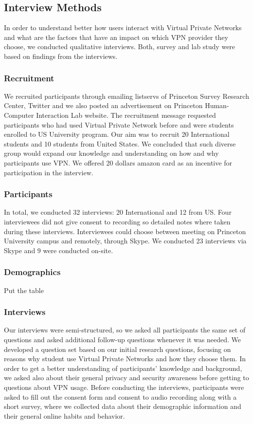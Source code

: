 \subsection{Interview Methods}\label{Method}
In order to understand better how users interact with Virtual Private Networks and what are the factors that have an impact on which VPN provider they choose, we conducted qualitative interviews. Both, survey and lab study were based on findings from the interviews.
\subsubsection{Recruitment}
We recruited participants through emailing listservs of Princeton Survey Research Center, Twitter and we also posted an advertisement on Princeton Human-Computer Interaction Lab website. The recruitment message requested participants who had used Virtual Private Network before and were students enrolled to US University program. Our aim was to recruit 20 International students and 10 students from United States. We concluded that such diverse group would expand our knowledge and understanding on how and why participants use VPN. We offered 20 dollars amazon card as an incentive for participation in the interview.
\subsubsection{Participants}
In total, we conducted 32 interviews: 20 International and 12 from US. Four interviewees did not give consent to recording so detailed notes where taken during these interviews. Interviewees could choose between meeting on Princeton University campus and remotely, through Skype. We conducted 23 interviews via Skype and 9 were conducted on-site. 

\subsubsection{Demographics} Put the table

\subsubsection{Interviews}
Our interviews were semi-structured, so we asked all participants the same set of questions and asked additional follow-up questions whenever it was needed. We developed a question set based on our initial research questions, focusing on reasons why student use Virtual Private Networks and how they choose them. In order to get a better understanding of participants' knowledge and background, we asked also about their general privacy and security awareness before getting to questions about VPN usage. 
Before conducting the interviews, participants were asked to fill out the consent form and consent to audio recording along with a short survey, where we collected data about their demographic information and their general online habits and behavior. 

